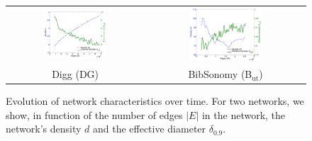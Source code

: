 \documentclass[11pt,a4paper]{book}
\newcommand{\wTwo}{0.48}
\begin{document}
\begin{figure}[h!]
  \centering
  \begin{tabular}{cc}
    \includegraphics[width=\wTwo\textwidth]{img-st/diadens.munmun_digg_reply} &
    \includegraphics[width=\wTwo\textwidth]{img-st/diadens.bibsonomy-2ut} \\
    Digg (\textsf{DG}) &
    BibSonomy (\textsf{B$_{\mathrm{ut}}$})
  \end{tabular}

  \caption{
    Evolution of network characteristics over time.  For two networks,
    we show, in function of the number of edges $|E|$ in the network, the
    network's density $d$ and the effective diameter $\delta_{0.9}$. 
  }
  \label{fig:evolution}
\end{figure}
\end{document}
